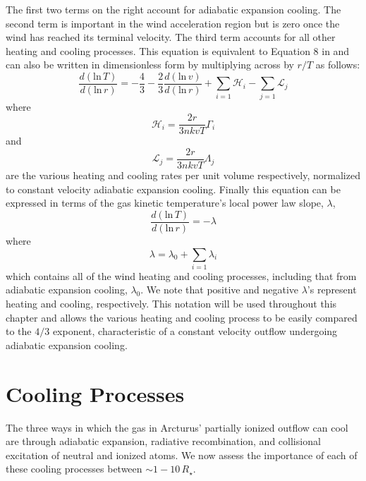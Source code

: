 The first two terms on the right account for adiabatic expansion cooling. The second term is important in the wind acceleration region but is zero once the wind has reached its terminal velocity. The third term accounts for all other heating and cooling processes. This equation is equivalent to Equation 8 in \cite{goldreich_1976} and can also be written in dimensionless form \citep{rodgers_1991} by multiplying across by $r/T$ as follows:
\begin{equation} 
\label{eq:7.8}
\frac{d(\mathrm{ln}\,T)}{d(\mathrm{ln}\,r)}=-\frac{4}{3}-\frac{2}{3}\frac{d(\mathrm{ln}\,v)}{d(\mathrm{ln}\,r)}+\displaystyle\sum_{i=1}\mathcal{H}_{i}-\displaystyle\sum_{j=1}\mathcal{L}_{j}
\end{equation} 
where 
\begin{equation}
\mathcal{H}_{i}=\frac{2r}{3nkvT}\Gamma_{i} 
\end{equation} 
and 
\begin{equation}
\label{eq:1.10}
\mathcal{L}_{j}=\frac{2r}{3nkvT}\Lambda_{j}
\end{equation} 
are the various heating and cooling rates per unit volume respectively, normalized to constant velocity adiabatic expansion cooling. Finally this equation can be expressed in terms of the gas kinetic temperature's local power law slope, $\lambda$, 
\begin{equation} \label{eq:lambda}
\frac{d(\mathrm{ln}\,T)}{d(\mathrm{ln}\,r)}=-\lambda
\end{equation}
where 
\begin{equation}
\lambda =\lambda_{0}+\displaystyle\sum_{i=1}\lambda_{i}
\end{equation} 
which contains all of the wind heating and cooling processes, including that from adiabatic expansion cooling, $\lambda_{0}$. We note that positive and negative $\lambda$'s represent heating and cooling, respectively. This notation will be used throughout this chapter and allows the various heating and cooling process to be easily compared to the $4/3$ exponent, characteristic of a constant velocity outflow undergoing adiabatic expansion cooling.

\section{Cooling Processes}\label{sec:7.3}
The three ways in which the gas in Arcturus' partially ionized outflow can cool are through adiabatic expansion, radiative recombination, and collisional excitation of neutral and ionized atoms. We now assess the importance of each of these cooling processes between $\sim 1-10\,R_{\star}$. 

